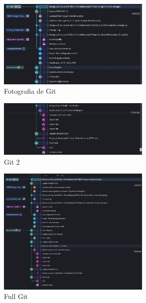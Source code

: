 \begin{figure}[H]
	\begin{center}
		\includegraphics[width=0.66\textwidth]{chapter/image/git1.png}
	\end{center}
		\caption{Fotografia de Git}
		\label{fig:viaconsulting-sophos-pic1}
\end{figure}



\begin{figure}[H]
	\begin{center}
		\includegraphics[width=0.66\textwidth]{chapter/image/git2.png}
	\end{center}
		\caption{Git 2}
		\label{fig:viaconsulting-sophos-pic1}
\end{figure}



\begin{figure}[H]
	\begin{center}
		\includegraphics[width=0.66\textwidth]{chapter/image/git3.png}
	\end{center}
		\caption{Full Git}
		\label{fig:viaconsulting-sophos-pic1}
\end{figure}


